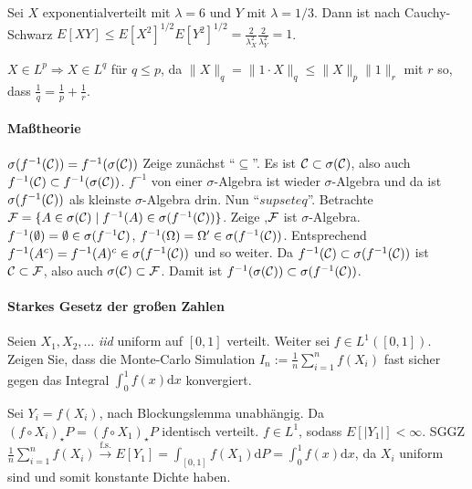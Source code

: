 \documentclass{article}
\begin{document}
Sei $X$ exponentialverteilt mit $\lambda=6$ und $Y$ mit $\lambda=1/3$. Dann ist nach Cauchy-Schwarz $E[XY]\leq E[X^2]^{1/2}E[Y^2]^{1/2}=\frac{2}{\lambda_X^2}\frac{2}{\lambda_Y^2}=1$.

$X\in L^p\Rightarrow X\in L^q$ für $q\leq p$, da $\|X\|_q=\|1\cdot X\|_q\leq\|X\|_p\|1\|_r$ mit $r$ so, dass $\frac{1}{q}=\frac{1}{p}+\frac{1}{r}$.

\paragraph{Maßtheorie}
$\sigma(f^{-1}({\cal C}))=f^{-1}(\sigma({\cal C}))$
Zeige zunächst ``$\subseteq$''.
Es ist ${\cal C}\subset\sigma({\cal C})$, also auch $f^{-1}({\cal C})\subset f^{-1}(\sigma({\cal C}))$.
$f^{-1}$ von einer $\sigma$-Algebra ist wieder $\sigma$-Algebra und da ist $\sigma(f^{-1}({\cal C}))$ als kleinste $\sigma$-Algebra drin.
Nun ``$supseteq$''.
Betrachte ${\cal F}=\{A\in\sigma({\cal C})\mid f^{-1}(A)\in\sigma(f^{-1}({\cal C}))\}$.
Zeige ,${\cal F}$ ist $\sigma$-Algebra.
$f^{-1}(\emptyset)=\emptyset\in\sigma(f^{-1}{\cal C})$, $f^{-1}(\Omega)=\Omega'\in\sigma(f^{-1}({\cal C}))$.
Entsprechend $f^{-1}(A^c)=f^{-1}(A)^c\in\sigma(f^{-1}({\cal C}))$ und so weiter.
Da $f^{-1}({\cal C})\subset\sigma(f^{-1}({\cal C}))$ ist ${\cal C}\subset{\cal F}$, also auch $\sigma({\cal C})\subset{\cal F}$.
Damit ist $f^{-1}(\sigma({\cal C}))\subset\sigma(f^{-1}({\cal C}))$.

\paragraph{Starkes Gesetz der großen Zahlen}
Seien $X_1,X_2,\dots$ \emph{iid} uniform auf $[0,1]$ verteilt.
Weiter sei $f\in L^1([0,1])$.
Zeigen Sie, dass die Monte-Carlo Simulation $\hat{I}_n:=\frac{1}{n}\sum_{i=1}^nf(X_i)$ fast sicher gegen das Integral $\int_0^1f(x)\mathrm{d}x$ konvergiert.

Sei $Y_i=f(X_i)$, nach Blockungslemma unabhängig.
Da $(f\circ X_i)_\star P=(f\circ X_1)_\star P$ identisch verteilt.
$f\in L^1$, sodass $E[|Y_1|]<\infty$.
SGGZ $\frac{1}{n}\sum_{i=1}^nf(X_i)\xrightarrow{\text{f.s.}}E[Y_1]=\int_{[0,1]}f(X_1)\mathrm{d}P=\int_0^1f(x)\mathrm{d}x$, da $X_i$ uniform sind und somit konstante Dichte haben.

\end{document}
